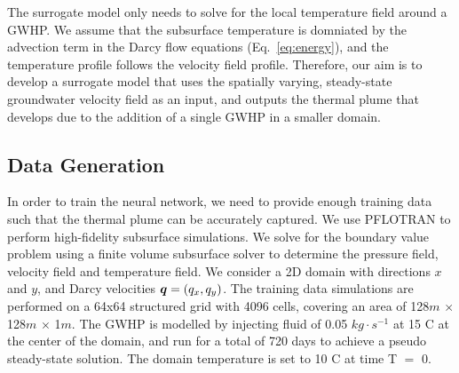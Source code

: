 \documentclass{article} %
\begin{document}
The surrogate model only needs to solve for the local temperature field around a GWHP. 
We assume that the subsurface temperature is domniated by the advection term in the Darcy flow equations (Eq.~\ref{eq:energy}), and the temperature profile follows the velocity field profile. 
Therefore, our aim is to develop a surrogate model that uses the spatially varying, steady-state groundwater velocity field as an input, and outputs the thermal plume that develops due to the addition of a single GWHP in a smaller domain. 


\subsection*{Data Generation}


In order to train the neural network, we need to provide enough training data such that the thermal plume can be accurately captured. We use PFLOTRAN \citep{pflotran-paper} to perform high-fidelity subsurface simulations.
We solve for the boundary value problem using a finite volume subsurface solver to determine the pressure field, velocity field and temperature field.
We consider a 2D domain with directions $x$ and $y$, and Darcy velocities ${\bm{q}} = (q_x, q_y)$.
The training data simulations are performed on a 64x64 structured grid with 4096 cells, covering an area of 128$m$ $\times$ 128$m$ $\times$ 1$m$. The GWHP is modelled by injecting fluid of 0.05 $kg \cdot s^{-1}$ at 15 \degree C at the center of the domain, and run for a total of 720 days to achieve a pseudo steady-state solution. The domain temperature is set to 10 \degree C at time T $=$ 0.
\end{document}
